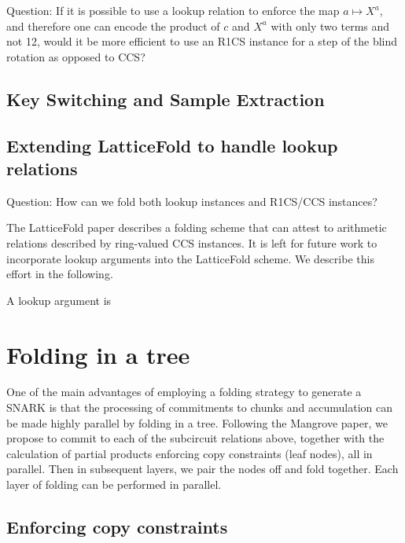 \documentclass{article}
\begin{document}
Question: If it is possible to use a lookup relation to enforce the map $a \mapsto X^a$, and therefore one can encode the product of $c$ and $X^a$ with only two terms and not 12, would it be more efficient to use an R1CS instance for a step of the blind rotation as opposed to CCS?

\subsection{Key Switching and Sample Extraction}



\subsection{Extending LatticeFold to handle lookup relations}

Question: How can we fold both lookup instances and R1CS/CCS instances?

The LatticeFold paper describes a folding scheme that can attest to arithmetic relations described by ring-valued CCS instances. It is left for future work to incorporate lookup arguments into the LatticeFold scheme. We describe this effort in the following.

A lookup argument is

\section{Folding in a tree}

One of the main advantages of employing a folding strategy to generate a SNARK is that the processing of commitments to chunks and accumulation can be made highly parallel by folding in a tree. Following the Mangrove paper, we propose to commit to each of the subcircuit relations above, together with the calculation of partial products enforcing copy constraints (leaf nodes), all in parallel. Then in subsequent layers, we pair the nodes off and fold together. Each layer of folding can be performed in parallel.

\subsection{Enforcing copy constraints}
\end{document}

